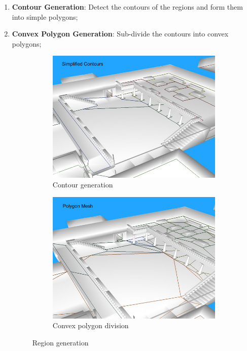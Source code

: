 \documentclass[a4paper,11pt]{article}
\begin{document}
\begin{enumerate}
  \item\textbf{Contour Generation}: Detect the contours of the regions and form them into simple polygons;

  
  \item\textbf{Convex Polygon Generation}:  Sub-divide the contours into convex polygons;
  
  \begin{figure}[H]
        \centering
        \begin{subfigure}[b]{0.48\textwidth}
                \centering
                \includegraphics[width=\textwidth]{cont_11_simplified_full.png}
                \caption{Contour generation}
        \end{subfigure}
        \begin{subfigure}[b]{0.48\textwidth}
                \centering
                \includegraphics[width=\textwidth]{stage_polygon_mesh.png}
                \caption{Convex polygon division}
        \end{subfigure}
        \caption{Region generation}
	\end{figure}   
  

\end{enumerate}
\end{document}
